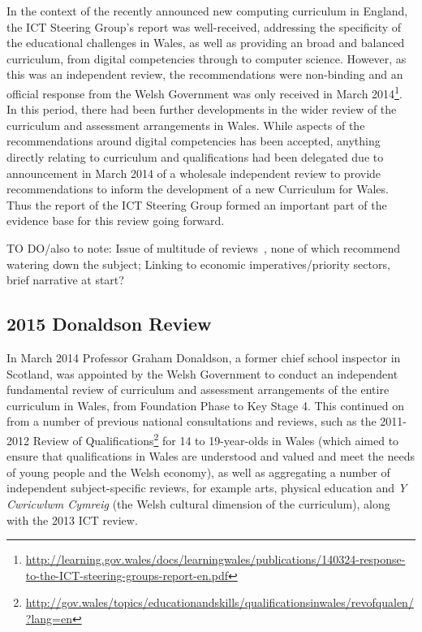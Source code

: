 \documentclass{sig-alternate}
\begin{document}
In the context of the recently announced new computing curriculum in
England, the ICT Steering Group's report was well-received, addressing
the specificity of the educational challenges in Wales, as well as
providing an broad and balanced curriculum, from digital competencies
through to computer science. However, as this was an independent
review, the recommendations were non-binding and an official response
from the Welsh Government was only received in March
2014\footnote{\url{http://learning.gov.wales/docs/learningwales/publications/140324-response-to-the-ICT-steering-groups-report-en.pdf}}. In
this period, there had been further developments in the wider review
of the curriculum and assessment arrangements in Wales. While aspects
of the recommendations around digital competencies has been accepted,
anything directly relating to curriculum and qualifications had been
delegated due to announcement in March 2014 of a wholesale independent
review to provide recommendations to inform the development of a new
Curriculum for Wales. Thus the report of the ICT Steering Group formed
an important part of the evidence base for this review going forward.

TO DO/also to note: Issue of multitude of reviews~\cite{Evans:2015}, none of which recommend watering down
the subject; Linking to economic imperatives/priority sectors, brief
narrative at start?

\subsection{2015 Donaldson Review}

In March 2014 Professor Graham Donaldson, a former chief school
inspector in Scotland, was appointed by the Welsh Government to
conduct an independent fundamental review of curriculum and assessment
arrangements of the entire curriculum in Wales, from Foundation Phase
to Key Stage 4. This continued on from a number of previous national
consultations and reviews, such as the 2011-2012 Review of
Qualifications\footnote{\url{http://gov.wales/topics/educationandskills/qualificationsinwales/revofqualen/?lang=en}}
for 14 to 19-year-olds in Wales (which aimed to ensure that
qualifications in Wales are understood and valued and meet the needs
of young people and the Welsh economy), as well as aggregating a
number of independent subject-specific reviews, for example arts,
physical education and {\emph{Y Cwricwlwm Cymreig}} (the Welsh
cultural dimension of the curriculum), along with the 2013 ICT review.
\end{document}
